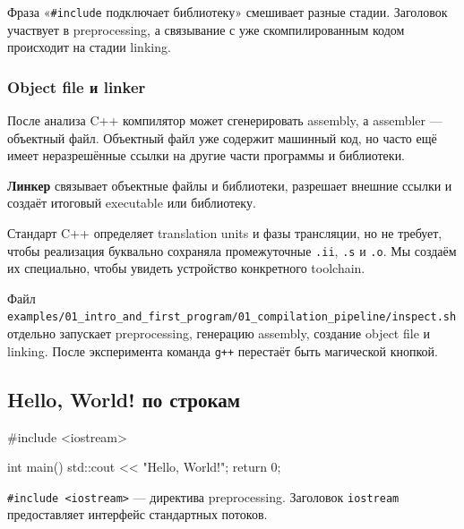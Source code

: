 \begin{mistakebox}
Фраза «\texttt{\#include} подключает библиотеку» смешивает разные стадии.
Заголовок участвует в preprocessing, а связывание с уже скомпилированным кодом
происходит на стадии linking.
\end{mistakebox}

\subsubsection{Object file и linker}

После анализа C++ компилятор может сгенерировать assembly, а assembler ---
объектный файл. Объектный файл уже содержит машинный код, но часто ещё имеет
неразрешённые ссылки на другие части программы и библиотеки.

\begin{definition}
\textbf{Линкер} связывает объектные файлы и библиотеки, разрешает внешние ссылки
и создаёт итоговый executable или библиотеку.
\end{definition}

\begin{standardbox}
Стандарт C++ определяет translation units и фазы трансляции, но не требует,
чтобы реализация буквально сохраняла промежуточные \texttt{.ii},
\texttt{.s} и \texttt{.o}. Мы создаём их специально, чтобы увидеть устройство
конкретного toolchain.
\end{standardbox}

\begin{practicebox}
Файл \texttt{examples/01\_intro\_and\_first\_program/01\_compilation\_pipeline/inspect.sh}
отдельно запускает preprocessing, генерацию assembly, создание object file и
linking. После эксперимента команда \texttt{g++} перестаёт быть магической
кнопкой.
\end{practicebox}

\subsection{Hello, World! по строкам}

\begin{cppcode}
#include <iostream>

int main() {
    std::cout << "Hello, World!\n";
    return 0;
}
\end{cppcode}

\texttt{\#include <iostream>} --- директива preprocessing.
Заголовок \texttt{iostream} предоставляет интерфейс стандартных потоков.

